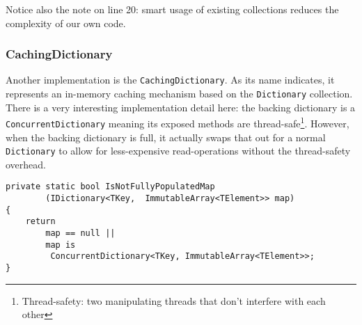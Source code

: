 Notice also the note on line 20: smart usage of existing collections reduces the complexity of our own code.

\subsubsection{CachingDictionary}
\label{sec:spec-coll-cachingdictionary}

Another implementation is the \texttt{CachingDictionary}. As its name indicates, it represents an in-memory caching mechanism based on the \texttt{Dictionary} collection. There is a very interesting implementation detail here: the backing dictionary is a \texttt{ConcurrentDictionary} meaning its exposed methods are thread-safe\footnote{Thread-safety: two manipulating threads that don't interfere with each other}. However, when the backing dictionary is full, it actually swaps that out for a normal \texttt{Dictionary} to allow for less-expensive read-operations without the thread-safety overhead.

\begin{lstlisting}
private static bool IsNotFullyPopulatedMap
		(IDictionary<TKey,	ImmutableArray<TElement>> map)
{
	return 
		map == null || 
		map is 
		 ConcurrentDictionary<TKey, ImmutableArray<TElement>>;
}
\end{lstlisting}

